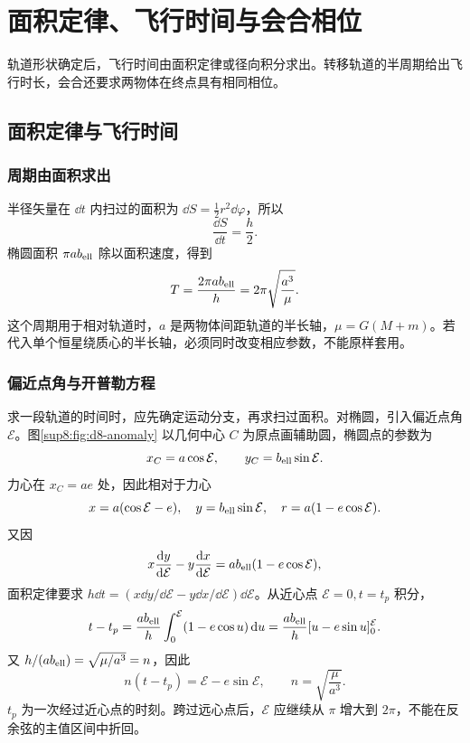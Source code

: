 \section{面积定律、飞行时间与会合相位}

轨道形状确定后，飞行时间由面积定律或径向积分求出。转移轨道的半周期给出飞行时长，会合还要求两物体在终点具有相同相位。



\subsection{面积定律与飞行时间}
\subsubsection{周期由面积求出}

半径矢量在 $\dd t$ 内扫过的面积为 $\dd S=\tfrac12r^2\dd\varphi$，所以
\begin{equation}
 \frac{\dd S}{\dd t}=\frac h2.
\end{equation}
椭圆面积 $\pi ab_{\rm ell}$ 除以面积速度，得到
\begin{equation}\label{sup8:eq:d8-period}
 T=\frac{2\pi ab_{\rm ell}}h=2\pi\sqrt{\frac{a^3}{\mu}}.
\end{equation}
这个周期用于相对轨道时，$a$ 是两物体间距轨道的半长轴，$\mu=G(M+m)$。若代入单个恒星绕质心的半长轴，必须同时改变相应参数，不能原样套用。

\subsubsection{偏近点角与开普勒方程}

求一段轨道的时间时，应先确定运动分支，再求扫过面积。对椭圆，引入偏近点角 $\mathcal E$。图\ref{sup8:fig:d8-anomaly} 以几何中心 $C$ 为原点画辅助圆，椭圆点的参数为
\[
 x_C=a\cos\mathcal E,\qquad y_C=b_{\rm ell}\sin\mathcal E.
\]
力心在 $x_C=ae$ 处，因此相对于力心
\begin{equation}
 x=a(\cos\mathcal E-e),\quad
 y=b_{\rm ell}\sin\mathcal E,\quad
 r=a(1-e\cos\mathcal E).
\end{equation}
又因
\[
 x\frac{\mathop{}\!\mathrm d y}{\mathop{}\!\mathrm d\mathcal E}-y\frac{\mathop{}\!\mathrm d x}{\mathop{}\!\mathrm d\mathcal E}
 =ab_{\rm ell}(1-e\cos\mathcal E),
\]
面积定律要求 $h\dd t=(x\dd y/\dd\mathcal E-y\dd x/\dd\mathcal E)\dd\mathcal E$。从近心点 $\mathcal E=0,t=t_p$ 积分，
\[
t-t_p=\frac{ab_{\rm ell}}h\int_0^{\mathcal E}(1-e\cos u)\mathop{}\!\mathrm d u
=\frac{ab_{\rm ell}}h[u-e\sin u]_0^{\mathcal E}.
\]
又 $h/(ab_{\rm ell})=\sqrt{\mu/a^3}=n$，因此
\begin{equation}\label{sup8:eq:d8-kepler}
 n(t-t_p)=\mathcal E-e\sin\mathcal E,\qquad
 n=\sqrt{\frac{\mu}{a^3}}.
\end{equation}
$t_p$ 为一次经过近心点的时刻。跨过远心点后，$\mathcal E$ 应继续从 $\pi$ 增大到 $2\pi$，不能在反余弦的主值区间中折回。

